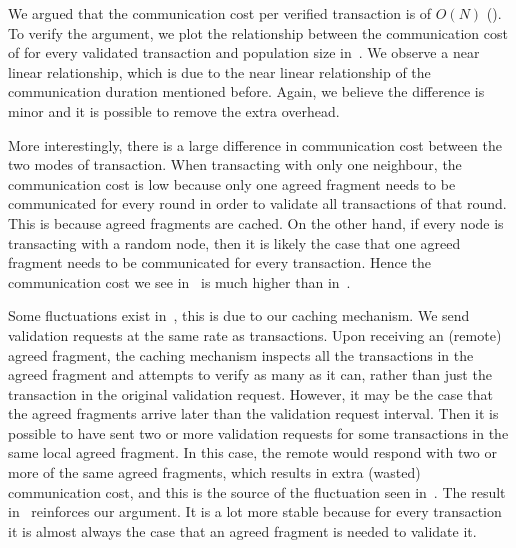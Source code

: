 We argued that the communication cost per verified transaction is of $O(N)$ ().
To verify the argument, we plot the relationship between the communication cost of for every validated transaction and population size in~.
We observe a near linear relationship, which is due to the near linear relationship of the communication duration mentioned before.
Again, we believe the difference is minor and it is possible to remove the extra overhead.

More interestingly, there is a large difference in communication cost between the two modes of transaction.
When transacting with only one neighbour, the communication cost is low because only one agreed fragment needs to be communicated for every round in order to validate all transactions of that round.
This is because agreed fragments are cached.
On the other hand,
if every node is transacting with a random node, then it is likely the case that one agreed fragment needs to be communicated for every transaction.
Hence the communication cost we see in~ is much higher than in~.

Some fluctuations exist in~, this is due to our caching mechanism.
We send validation requests at the same rate as transactions.
Upon receiving an (remote) agreed fragment, the caching mechanism inspects all the transactions in the agreed fragment and attempts to verify as many as it can,
rather than just the transaction in the original validation request.
However, it may be the case that the agreed fragments arrive later than the validation request interval.
Then it is possible to have sent two or more validation requests for some transactions in the same local agreed fragment.
In this case, the remote would respond with two or more of the same agreed fragments,
which results in extra (wasted) communication cost, and this is the source of the fluctuation seen in~.
The result in~ reinforces our argument.
It is a lot more stable because for every transaction it is almost always the case that an agreed fragment is needed to validate it.

